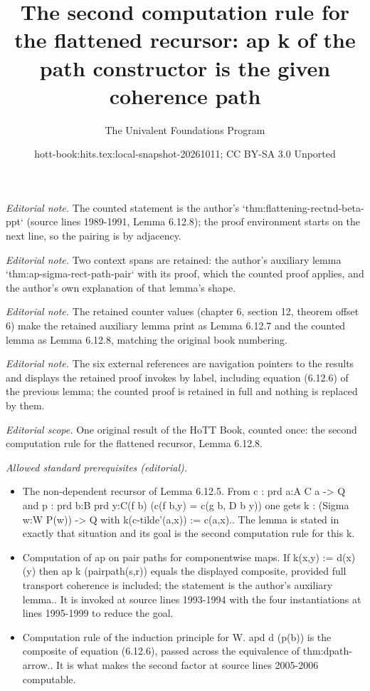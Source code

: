 \documentclass[10pt,a4paper]{article}
\title{The second computation rule for the flattened recursor: ap k of the path constructor is the given coherence path}
\author{The Univalent Foundations Program}
\date{hott-book:hits.tex:local-snapshot-20261011; CC BY-SA 3.0 Unported}
\newcounter{chapter}
\theoremstyle{definition}
\theoremstyle{remark}
\numberwithin{equation}{section}
\begin{document}
\maketitle
\setcounter{chapter}{6}
\setcounter{section}{12}
\setcounter{thm}{6}
\noindent\textit{Editorial note.} The counted statement is the author's `thm:flattening-rectnd-beta-ppt` (source lines 1989-1991, Lemma 6.12.8); the proof environment starts on the next line, so the pairing is by adjacency.\par\medskip
\noindent\textit{Editorial note.} Two context spans are retained: the author's auxiliary lemma `thm:ap-sigma-rect-path-pair` with its proof, which the counted proof applies, and the author's own explanation of that lemma's shape.\par\medskip
\noindent\textit{Editorial note.} The retained counter values (chapter 6, section 12, theorem offset 6) make the retained auxiliary lemma print as Lemma 6.12.7 and the counted lemma as Lemma 6.12.8, matching the original book numbering.\par\medskip
\noindent\textit{Editorial note.} The six external references are navigation pointers to the results and displays the retained proof invokes by label, including equation (6.12.6) of the previous lemma; the counted proof is retained in full and nothing is replaced by them.\par\medskip
\noindent\textit{Editorial scope.} One original result of the HoTT Book, counted once: the second computation rule for the flattened recursor, Lemma 6.12.8.\par\medskip
\noindent\textit{Allowed standard prerequisites (editorial).}\begin{itemize}
\item The non-dependent recursor of Lemma 6.12.5. From c : prd a:A C a -> Q and p : prd b:B prd y:C(f b) (c(f b,y) = c(g b, D b y)) one gets k : (Sigma w:W P(w)) -> Q with k(c-tilde'(a,x)) := c(a,x).. The lemma is stated in exactly that situation and its goal is the second computation rule for this k.
\item Computation of ap on pair paths for componentwise maps. If k(x,y) := d(x)(y) then ap k (pairpath(s,r)) equals the displayed composite, provided full transport coherence is included; the statement is the author's auxiliary lemma.. It is invoked at source lines 1993-1994 with the four instantiations at lines 1995-1999 to reduce the goal.
\item Computation rule of the induction principle for W. apd d (p(b)) is the composite of equation (6.12.6), passed across the equivalence of thm:dpath-arrow.. It is what makes the second factor at source lines 2005-2006 computable.
\end{itemize}\medskip
\end{document}
